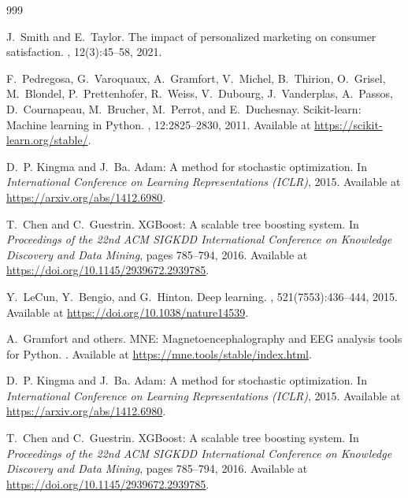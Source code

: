 \documentclass[12pt, a4paper,twoside]{report}
\theoremstyle{plain} %
\theoremstyle{definition} %
\theoremstyle{remark} %
\numberwithin{equation}{chapter}
\begin{document}
\begin{thebibliography}{999} %


J.~Smith and E.~Taylor.
\newblock The impact of personalized marketing on consumer satisfaction.
, 12(3):45--58, 2021.

F.~Pedregosa, G.~Varoquaux, A.~Gramfort, V.~Michel, B.~Thirion, O.~Grisel, M.~Blondel, P.~Prettenhofer, R.~Weiss, V.~Dubourg, J.~Vanderplas, A.~Passos, D.~Cournapeau, M.~Brucher, M.~Perrot, and E.~Duchesnay.
\newblock Scikit-learn: Machine learning in Python.
, 12:2825--2830, 2011.
\newblock Available at \url{https://scikit-learn.org/stable/}.

D.~P. Kingma and J.~Ba.
\newblock Adam: A method for stochastic optimization.
\newblock In {\em International Conference on Learning Representations (ICLR)}, 2015.
\newblock Available at \url{https://arxiv.org/abs/1412.6980}.

T.~Chen and C.~Guestrin.
\newblock XGBoost: A scalable tree boosting system.
\newblock In {\em Proceedings of the 22nd ACM SIGKDD International Conference on Knowledge Discovery and Data Mining}, pages 785--794, 2016.
\newblock Available at \url{https://doi.org/10.1145/2939672.2939785}.

Y.~LeCun, Y.~Bengio, and G.~Hinton.
\newblock Deep learning.
, 521(7553):436--444, 2015.
\newblock Available at \url{https://doi.org/10.1038/nature14539}.

A.~Gramfort and others.
\newblock MNE: Magnetoencephalography and EEG analysis tools for Python.
.
\newblock Available at \url{https://mne.tools/stable/index.html}.


D.~P. Kingma and J.~Ba.
\newblock Adam: A method for stochastic optimization.
\newblock In {\em International Conference on Learning Representations (ICLR)}, 2015.
\newblock Available at \url{https://arxiv.org/abs/1412.6980}.

T.~Chen and C.~Guestrin.
\newblock XGBoost: A scalable tree boosting system.
\newblock In {\em Proceedings of the 22nd ACM SIGKDD International Conference on Knowledge Discovery and Data Mining}, pages 785--794, 2016.
\newblock Available at \url{https://doi.org/10.1145/2939672.2939785}.


\end{thebibliography}
\end{document}

